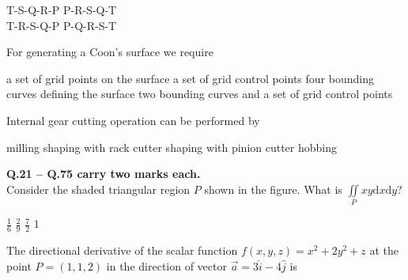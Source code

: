 \documentclass[addpoints,11pt]{exam}
\begin{document}
\begin{questions}
    \begin{oneparchoices}
        \choice T-S-Q-R-P
        \choice P-R-S-Q-T\\
        \choice T-R-S-Q-P
        \choice P-Q-R-S-T
    \end{oneparchoices}

    \question For generating a Coon's surface we require
    \begin{choices}
        \choice a set of grid points on the surface
        \choice a set of grid control points
        \choice four bounding curves defining the surface
        \choice two bounding curves and a set of grid control points
    \end{choices}

    \question Internal gear cutting operation can be performed by
    \begin{choices}
        \choice milling
        \choice shaping with rack cutter
        \choice shaping with pinion cutter
        \choice hobbing
    \end{choices}
    \pagebreak
    \large\textbf{Q.21 -- Q.75 carry two marks each.}\\
    \question Consider the shaded triangular region $P$ shown in the figure. What is $\iint\limits_P xy\mathrm{d}x\mathrm{d}y$?
    \begin{center}
    \end{center}

    \begin{oneparchoices}
        \choice $\frac{1}{6}$
        \choice $\frac{2}{9}$
        \choice $\frac{7}{2}$
        \choice $1$
    \end{oneparchoices}

    \question The directional derivative of the scalar function $f(x,y,z) = x^2 + 2y^2 + z$ at the point $P=(1,1,2)$ in the direction of vector $\overrightarrow{a} = 3\hat{i} -4\hat{j}$ is


\end{questions}
\end{document}
